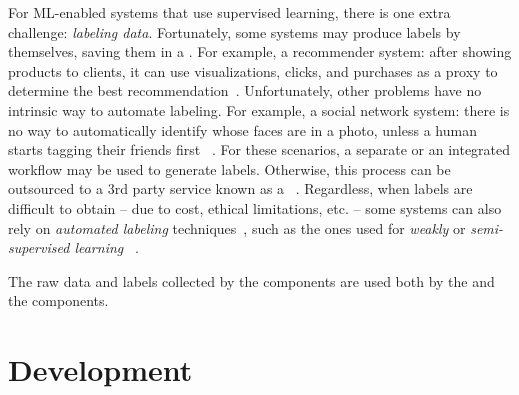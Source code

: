   For ML-enabled systems that use supervised learning, there is one extra
  challenge: \emph{labeling data}.
  Fortunately, some systems may produce labels by themselves,
  saving them in a .
  For example, a recommender system: after showing products to
  clients, it can use visualizations, clicks, and purchases as a proxy
  to determine the best recommendation~\parencite{Bernardi2019150Booking.com}.
  Unfortunately, other problems have no intrinsic way to automate labeling.
  For example, a social network system: there is no way to automatically identify
  whose faces are in a photo, unless a human starts tagging their friends first%
  ~\parencite{Tufail2023AdvancementsAlgorithms}.
  For these scenarios, a separate  or an
  integrated workflow may be used to generate labels.
  Otherwise, this process can be outsourced to a 3rd party service known as a
  \mbox{~\parencite{Buhrmester2018AnUse,
  SambasivanShivaniKapaniaHannahHighfll2021EveryoneAI}}.
  Regardless, when labels are difficult to obtain -- due to cost, ethical
  limitations, etc. -- some systems can also rely on \emph{automated labeling}
  techniques~\parencite{Ratner2017Snorkel}, such as the ones used for
  \emph{weakly} or \emph{semi-supervised learning}%
  ~\parencite{RussellS2021Artificial4th}.

  The raw data and labels collected by the  
  components are used both by the  and the
   components.

  \section{Development}
  \label{sec:ref_development}

